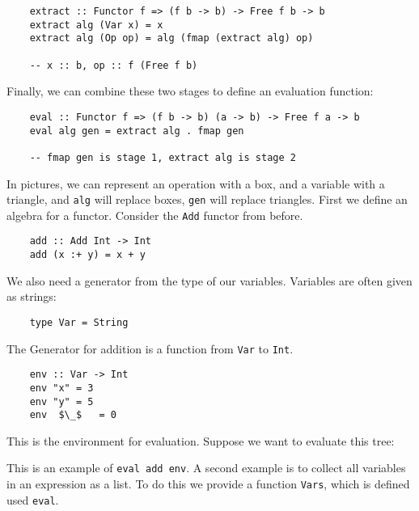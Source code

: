 \documentclass[a4paper,12pt]{article}
\theoremstyle{remark}
\begin{document}
\begin{lstlisting}
    extract :: Functor f => (f b -> b) -> Free f b -> b
    extract alg (Var x) = x
    extract alg (Op op) = alg (fmap (extract alg) op)

    -- x :: b, op :: f (Free f b)  \end{lstlisting}

Finally, we can combine these two stages to define an evaluation function:

\begin{lstlisting}
    eval :: Functor f => (f b -> b) (a -> b) -> Free f a -> b
    eval alg gen = extract alg . fmap gen

    -- fmap gen is stage 1, extract alg is stage 2  \end{lstlisting}

In pictures, we can represent an operation with a box, and a variable with a triangle,
and \lstinline{alg} will replace boxes, \lstinline{gen} will replace triangles. First we define an algebra for
a functor. Consider the \lstinline{Add} functor from before.

\begin{lstlisting}
    add :: Add Int -> Int
    add (x :+ y) = x + y  \end{lstlisting}

We also need a generator from the type of our variables. Variables are often given
as strings:

\begin{lstlisting}
    type Var = String  \end{lstlisting}

The Generator for addition is a function from \lstinline{Var} to \lstinline{Int}.

\begin{lstlisting}
    env :: Var -> Int
    env "x" = 3
    env "y" = 5
    env  $\_$   = 0  \end{lstlisting}

This is the environment for evaluation. Suppose we want to evaluate this tree:

\begin{figure}[H]
  \centering
\end{figure}

This is an example of \lstinline{eval add env}. A second example is to collect all
variables in an expression as a list. To do this we provide a function \lstinline{Vars},
which is defined used \lstinline{eval}.
\end{document}
